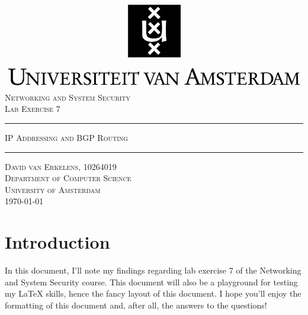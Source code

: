 \documentclass[12pt]{article}
\begin{document}
\begin{titlepage}
\begin{center}
    \includegraphics[width=\textwidth]{./logo.png}
    \\ [2.5cm]
    \textsc{\Large Networking and System Security}
    \\ [0.5cm]
    \textsc{\large Lab Exercise 7}
    \\ [1cm]
    \hrule
    \vspace{0.3cm}
    \textsc{IP Addressing and BGP Routing}
    \\ [0.3cm]
    \hrule
    \vfill
    \textsc{David van Erkelens, 10264019 \\[0.3cm] Department of Computer Science \\ University of Amsterdam \\[0.3cm] \today}
\end{center}
\end{titlepage}
\tableofcontents
\clearpage
\section{Introduction}
In this document, I'll note my findings regarding lab exercise 7
of the Networking and System Security course. This document will also
be a playground for testing my LaTeX skills, hence the fancy layout of
this document. I hope you'll enjoy the formatting of this document and,
after all, the answers to the questions!
\end{document}
